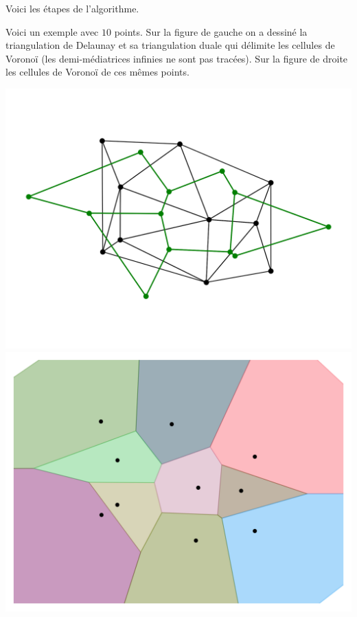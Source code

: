 \documentclass[11pt,class=report,crop=false]{standalone}
\begin{document}
Voici les étapes de l'algorithme.



\bigskip

Voici un exemple avec $10$ points. Sur la figure de gauche on a dessiné la triangulation de Delaunay et sa triangulation duale qui délimite les cellules de Voronoï (les demi-médiatrices infinies ne sont pas tracées). Sur la figure de droite les cellules de Voronoï de ces mêmes points. 
\begin{center}
	\includegraphics[scale=\myscale,scale=0.45]{figures/voronoi01a}
	\qquad
	\includegraphics[scale=\myscale,scale=0.45]{figures/voronoi01b}	
\end{center}
\end{document}
